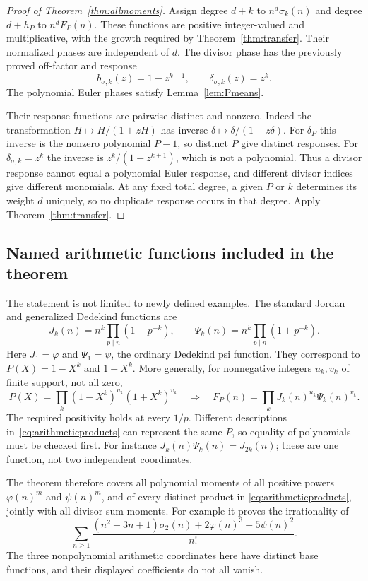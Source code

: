 \begin{proof}[Proof of Theorem~\ref{thm:allmoments}]
Assign degree $d+k$ to $n^d\sigma_k(n)$ and degree $d+h_P$ to
$n^dF_P(n)$. These functions are positive integer-valued and
multiplicative, with the growth required by Theorem~\ref{thm:transfer}.
Their normalized phases are independent of $d$.
The divisor phase has the previously proved off-factor and response
\[
 b_{\sigma,k}(z)=1-z^{k+1},\qquad
 \delta_{\sigma,k}(z)=z^k.
\]
The polynomial Euler phases satisfy Lemma~\ref{lem:Pmeans}.

Their response functions are pairwise distinct and nonzero.
Indeed the transformation $H\mapsto H/(1+zH)$ has inverse
$\delta\mapsto\delta/(1-z\delta)$. For $\delta_P$ this inverse
is the nonzero polynomial $P-1$, so distinct $P$ give distinct
responses. For $\delta_{\sigma,k}=z^k$ the inverse is
$z^k/(1-z^{k+1})$, which is not a polynomial. Thus a divisor response
cannot equal a polynomial Euler response, and different divisor
indices give different monomials. At any fixed total degree, a
given $P$ or $k$ determines its weight $d$ uniquely, so no duplicate
response occurs in that degree. Apply Theorem~\ref{thm:transfer}.
\end{proof}

\subsection{Named arithmetic functions included in the theorem}
The statement is not limited to newly defined examples. The standard
Jordan and generalized Dedekind functions are
\[
 J_k(n)=n^k\prod_{p\mid n}(1-p^{-k}),\qquad
 \Psi_k(n)=n^k\prod_{p\mid n}(1+p^{-k}).
\]
Here $J_1=\varphi$ and $\Psi_1=\psi$, the ordinary Dedekind psi
function. They correspond to $P(X)=1-X^k$ and $1+X^k$.
More generally, for nonnegative integers $u_k,v_k$ of finite support,
not all zero,
\begin{equation}\label{eq:arithmeticproducts}
 P(X)=\prod_k(1-X^k)^{u_k}(1+X^k)^{v_k}
 \quad\Longrightarrow\quad
 F_P(n)=\prod_kJ_k(n)^{u_k}\Psi_k(n)^{v_k}.
\end{equation}
The required positivity holds at every $1/p$.
Different descriptions in~\eqref{eq:arithmeticproducts} can represent
the same $P$, so equality of polynomials must be checked first.
For instance $J_k(n)\Psi_k(n)=J_{2k}(n)$; these are one function,
not two independent coordinates.

The theorem therefore covers all polynomial moments of all positive powers
$\varphi(n)^m$ and $\psi(n)^m$, and of every distinct product in
\eqref{eq:arithmeticproducts}, jointly with all divisor-sum moments.
For example it proves the irrationality of
\begin{equation}\label{eq:newexample}
 \sum_{n\geq1}
 \frac{(n^2-3n+1)\sigma_2(n)+2\varphi(n)^3-5\psi(n)^2}{n!}.
\end{equation}
The three nonpolynomial arithmetic coordinates here have distinct
base functions, and their displayed coefficients do not all vanish.

